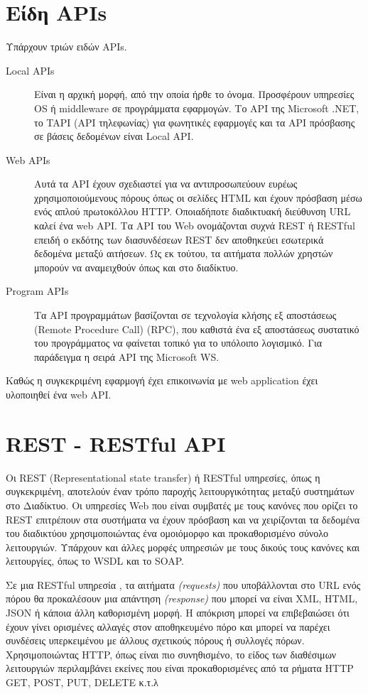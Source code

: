 \section{Είδη APIs}
Υπάρχουν τριών ειδών APIs. 

\begin{description}
\item[Local APIs] Eίναι η αρχική μορφή, από την οποία ήρθε το όνομα. Προσφέρουν υπηρεσίες OS ή middleware σε προγράμματα εφαρμογών. Το API της Microsoft .NET, το TAPI (API τηλεφωνίας) για φωνητικές εφαρμογές και τα API πρόσβασης σε βάσεις δεδομένων είναι  Local API. 
\item[Web APIs] Αυτά τα API έχουν σχεδιαστεί για να αντιπροσωπεύουν ευρέως χρησιμοποιούμενους πόρους όπως οι σελίδες HTML και έχουν πρόσβαση μέσω ενός απλού πρωτοκόλλου HTTP. Οποιαδήποτε διαδικτυακή διεύθυνση URL καλεί ένα web API. Τα API του Web ονομάζονται συχνά REST  ή RESTful επειδή ο εκδότης των διασυνδέσεων REST δεν αποθηκεύει εσωτερικά δεδομένα μεταξύ αιτήσεων. Ως εκ τούτου, τα αιτήματα πολλών χρηστών μπορούν να αναμειχθούν όπως και στο διαδίκτυο.
\item[Program APIs] Τα API προγραμμάτων βασίζονται σε τεχνολογία κλήσης εξ αποστάσεως (Remote Procedure Call) (RPC), που καθιστά ένα εξ αποστάσεως συστατικό του προγράμματος να φαίνεται τοπικό για το υπόλοιπο λογισμικό. Για παράδειγμα η σειρά API της Microsoft WS.
\end{description}

Καθώς η συγκεκριμένη εφαρμογή έχει επικοινωνία με web application έχει υλοποιηθεί ένα web API.

\section{REST - RESTful API}
Οι REST (Representational state transfer) ή RESTful υπηρεσίες, όπως η συγκεκριμένη, αποτελούν έναν τρόπο παροχής λειτουργικότητας μεταξύ συστημάτων στο Διαδίκτυο. Οι υπηρεσίες Web που είναι συμβατές με τους κανόνες που ορίζει το REST επιτρέπουν στα συστήματα να έχουν πρόσβαση και να χειρίζονται τα δεδομένα του διαδικτύου χρησιμοποιώντας ένα ομοιόμορφο και προκαθορισμένο σύνολο λειτουργιών. Υπάρχουν και άλλες μορφές υπηρεσιών με τους δικούς τους κανόνες και λειτουργίες, όπως το WSDL και το SOAP.
\par Σε μια RESTful υπηρεσία , τα αιτήματα \textit{(requests)} που υποβάλλονται στο URL ενός πόρου θα προκαλέσουν μια απάντηση \textit{(response)} που μπορεί να είναι XML, HTML, JSON ή κάποια άλλη καθορισμένη μορφή. Η απόκριση μπορεί να επιβεβαιώσει ότι έχουν γίνει ορισμένες αλλαγές στον αποθηκευμένο πόρο και μπορεί να παρέχει συνδέσεις υπερκειμένου με άλλους σχετικούς πόρους ή συλλογές πόρων. Χρησιμοποιώντας HTTP, όπως είναι πιο συνηθισμένο, το είδος των διαθέσιμων λειτουργιών περιλαμβάνει εκείνες που είναι προκαθορισμένες από τα ρήματα HTTP GET, POST, PUT, DELETE κ.τ.λ

